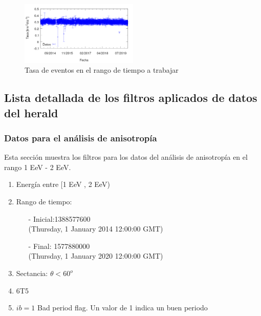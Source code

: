 
\begin{figure}[H]
	\centering
	\includegraphics[width=0.5\textwidth]{rate_total.png}
	\caption{Tasa  de eventos en el rango de tiempo a trabajar}
	\label{tasa_total_diaria}
\end{figure}

\subsection{Lista detallada de los filtros aplicados de datos del herald}

\subsubsection{Datos para el análisis de anisotropía}
Esta sección muestra los filtros para los datos del análisis de anisotropía en el rango 1 EeV - 2 EeV.

\begin{enumerate}
	\item Energía entre  [1 EeV , 2 EeV)
	\item Rango de tiempo:
	\begin{itemize}
		\item[-] Inicial:1388577600 \\ (Thursday, 1 January 2014 12:00:00 GMT)
		\item[-] Final: 1577880000  \\ (Thursday, 1 January 2020 12:00:00 GMT)
	\end{itemize}
	\item Sectancia:  $\theta < 60^o$
	\item 6T5
	\item $ib=1$ Bad period flag. Un valor de 1 indica un buen periodo
\end{enumerate}

